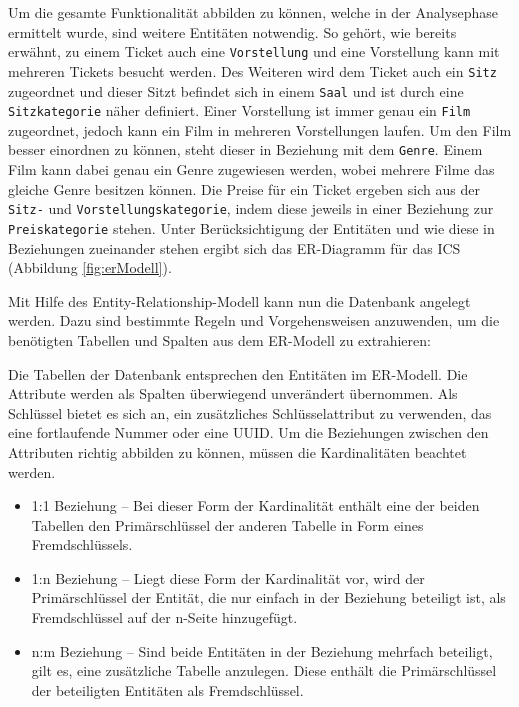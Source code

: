 		Um die gesamte Funktionalität abbilden zu können, welche in der Analysephase ermittelt wurde, sind weitere Entitäten notwendig. So gehört, wie bereits erwähnt, zu einem Ticket auch eine \texttt{Vorstellung} und eine Vorstellung kann mit	 mehreren Tickets besucht werden. Des Weiteren wird dem Ticket auch ein \texttt{Sitz} zugeordnet und dieser Sitzt befindet sich in einem \texttt{Saal} und ist durch eine \texttt{Sitzkategorie} näher definiert. Einer Vorstellung ist immer genau ein \texttt{Film} zugeordnet, jedoch kann ein Film in mehreren Vorstellungen laufen. Um den Film besser einordnen zu können, steht dieser in Beziehung mit dem \texttt{Genre}. Einem Film kann dabei genau ein Genre zugewiesen werden, wobei mehrere Filme das gleiche Genre besitzen können. Die Preise für ein Ticket ergeben sich aus der \texttt{Sitz-} und \texttt{Vorstellungskategorie}, indem diese jeweils in einer Beziehung zur \texttt{Preiskategorie} stehen. 
		Unter Berücksichtigung der Entitäten und wie diese in Beziehungen zueinander stehen ergibt sich das ER-Diagramm für das \ac{ICS} (Abbildung  \ref{fig:erModell}).
		
		Mit Hilfe des Entity-Relationship-Modell kann nun die Datenbank angelegt werden. Dazu sind bestimmte Regeln und Vorgehensweisen anzuwenden, um die benötigten Tabellen und Spalten aus dem ER-Modell zu extrahieren:
				
		Die Tabellen der Datenbank entsprechen den Entitäten im ER-Modell. Die Attribute werden als Spalten überwiegend unverändert übernommen. Als Schlüssel bietet es sich an, ein zusätzliches Schlüsselattribut zu verwenden, das eine fortlaufende Nummer oder eine \ac{UUID}. Um die Beziehungen zwischen den Attributen richtig abbilden zu können, müssen die Kardinalitäten beachtet werden. 
				\begin{itemize}
					\item 1:1 Beziehung -- Bei dieser Form der Kardinalität enthält eine der beiden Tabellen den Primärschlüssel der anderen Tabelle in Form eines Fremdschlüssels.
					\item 1:n Beziehung -- Liegt diese Form der Kardinalität vor, wird der Primärschlüssel der Entität, die nur einfach in der Beziehung beteiligt ist, als Fremdschlüssel auf der n-Seite hinzugefügt. 
					\item n:m Beziehung -- Sind beide Entitäten in der Beziehung mehrfach beteiligt, gilt es, eine zusätzliche Tabelle anzulegen. Diese enthält die Primärschlüssel der beteiligten Entitäten als Fremdschlüssel.
				\end{itemize}
		
